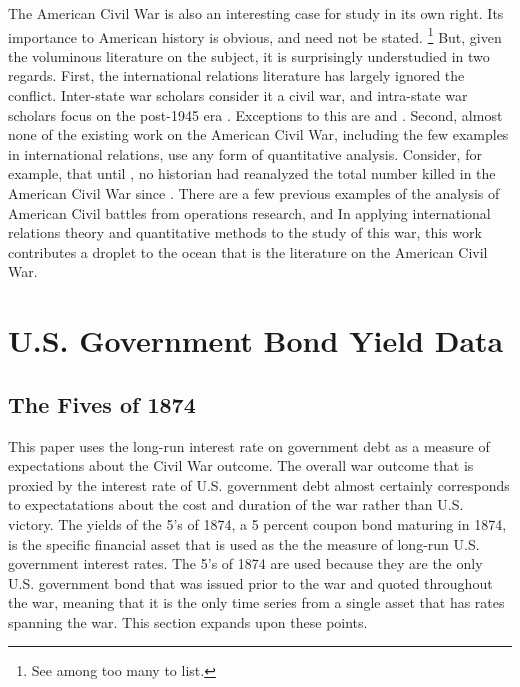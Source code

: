 The American Civil War is also an interesting case for study in its own right.
Its importance to American history is obvious, and need not be stated.%
\footnote{See \textcite{McPherson2003} among too many to list.}
But, given the voluminous literature on the subject, it is surprisingly understudied in two regards. %
First, the international relations literature has largely ignored the conflict.
Inter-state war scholars consider it a civil war, and intra-state war scholars focus on the post-1945 era \parencites[140-141]{Reiter2009}[2]{Poast2012}. %
Exceptions to this are \textcite{Reiter2009} and \textcite{Poast2012}.
Second, almost none of the existing work on the American Civil War, including the few examples in international relations, use any form of quantitative analysis.%
Consider, for example, that until \textcite{hacker2011census}, no historian had reanalyzed the total number killed in the American Civil War since \textcite{Livermore1900}.
There are a few previous examples of the analysis of American Civil battles from operations research, \textcite{Weiss1966} and
In applying international relations theory and quantitative methods to the study of this war, this work contributes a droplet to the ocean that is the literature on the American Civil War.



\section{U.S. Government Bond Yield Data}
\label{bonds_battles:sec:why-prices-study}



\subsection{The Fives of 1874}
\label{bonds_battles:sec:5s-1874}

This paper uses the long-run interest rate on government debt as a measure of expectations about the Civil War outcome.
The overall war outcome that is proxied by the interest rate of U.S. government debt almost certainly corresponds to expectatations about the cost and duration of the war rather than U.S. victory.
The yields of the 5's of 1874, a 5 percent coupon bond maturing in 1874, is the specific financial asset that is used as the the measure of long-run U.S. government interest rates.
The 5's of 1874 are used because they are the only U.S. government bond that was issued prior to the war and quoted throughout the war, meaning that it is the only time series from a single asset that has rates spanning the war.
This section expands upon these points.

